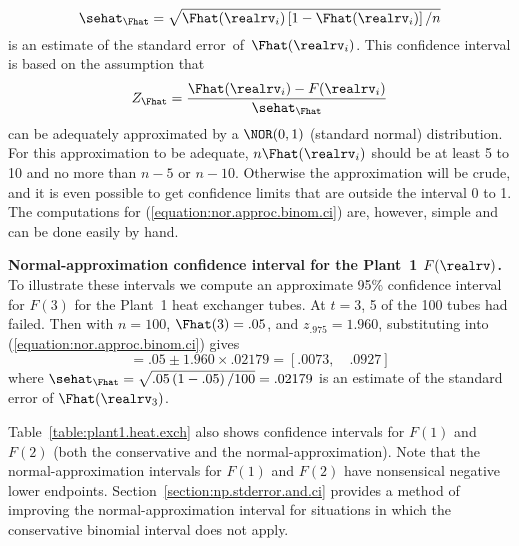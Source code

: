 \begin{equation}
\label{equation:binomial.var.ecdf}
\sehat_{\Fhat}=\sqrt{ \Fhat(\realrv_{i}) \left [1- \Fhat(\realrv_{i}) \right ]/ n }
\end{equation}
is an estimate of the
standard error~of~$\Fhat(\realrv_{i})$.
This confidence interval is
based on the assumption that
\begin{displaymath}
Z_{\Fhat}  = 
\frac{
     \Fhat(\realrv_{i})-F(\realrv_{i})
     }
     {
   \sehat_{\Fhat}
     }
\end{displaymath}
can be adequately approximated by a $\NOR(0,1)$ (standard normal)
distribution.  For this approximation to be adequate,
$n\Fhat(\realrv_{i})$ should be at least 5 to 10 and no more than
$n-5$ or $n-10$.  Otherwise the approximation will be crude, and it is
even possible to get confidence limits that are outside
the interval 0 to 1.  The computations for
(\ref{equation:nor.approc.binom.ci}) are, however, simple and can be
done easily by hand.
\begin{example}
{\bf Normal-approximation confidence interval for the Plant~1 $F(\realrv)$.} To
illustrate these intervals we compute an approximate 95\% confidence
interval for $F(3)$ for the Plant~1 heat exchanger tubes. At $t=3$, 5
of the 100 tubes had failed. Then with $n=100$, $\Fhat(3)=.05$, and
$z_{.975}=1.960$, substituting into
(\ref{equation:nor.approc.binom.ci}) gives
\begin{displaymath}
[\undertilde{F}(3), \quad \tilde{F}(3)] =
.05  \pm 1.960 \times .02179 = [.0073, \quad .0927]
\end{displaymath}
where 
$
\sehat_{\Fhat}=\sqrt{ .05 \left (1- .05\right )/ 100 } = .02179
$
is an estimate of the
standard error of $\Fhat(\realrv_{3})$.

Table~\ref{table:plant1.heat.exch} also shows confidence intervals for 
$F(1)$ and $F(2)$ (both the conservative and the
normal-approximation).
Note that the normal-approximation intervals for $F(1)$ and $F(2)$
have nonsensical negative lower endpoints.
Section~\ref{section:np.stderror.and.ci} provides a method of
improving the normal-approximation interval for situations in which
the conservative binomial interval does not apply. 
\end{example}
